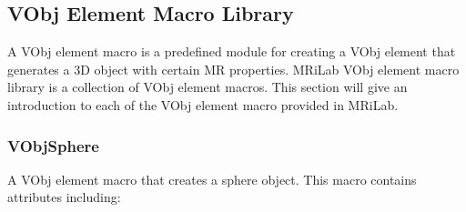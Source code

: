 \documentclass{book}%
\begin{document}
\subsection{VObj Element Macro Library}

A VObj element macro is a predefined module for creating a VObj element that generates a 3D object with certain MR properties. MRiLab VObj element macro library is a collection of VObj element macros. This section will give an introduction to each of the VObj element macro provided in MRiLab.

\subsubsection{VObjSphere}

A VObj element macro that creates a sphere object. This macro contains attributes including:
\end{document}
